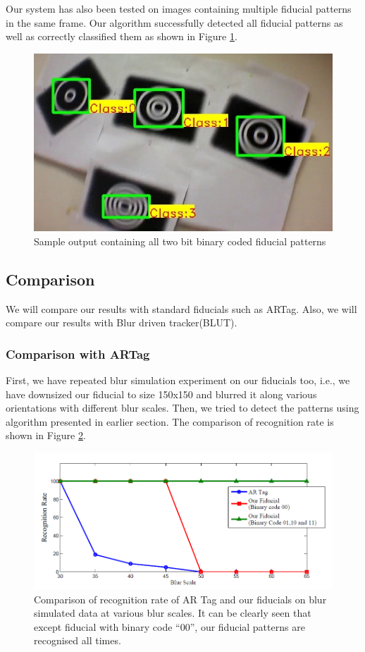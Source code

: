 \documentclass[runningheads]{llncs}
\begin{document}
Our system has also been tested on images containing multiple fiducial patterns
in the same frame. Our algorithm successfully detected all fiducial patterns as
well as correctly classified them as shown in Figure \ref{fig:output_all}.
\begin{figure}
\centering
  \includegraphics[width=.8\linewidth]{output_all_2.jpg}
  \caption{Sample output containing all two bit binary coded fiducial patterns}
  \label{fig:output_all}
\end{figure}

\subsection{Comparison}
We will compare our results with standard fiducials such as ARTag. Also, we will
compare our results with Blur driven tracker(BLUT)\cite{Wu:2011}.
\subsubsection{Comparison with ARTag}
First, we have repeated blur simulation experiment on our fiducials too, i.e.,
we have downsized our fiducial to size 150x150 and blurred it along various
orientations with different blur scales. Then, we tried to detect the patterns
using algorithm presented in earlier section. The comparison of recognition
rate is shown in Figure \ref{fig:recognition_rate}.

\begin{figure}
\centering
\includegraphics[width=\linewidth]{recognition_rate.png}
\caption{Comparison of recognition rate of AR Tag and our fiducials on
blur simulated data at various blur scales. It can be clearly seen that except
fiducial with binary code ``00'', our fiducial patterns are
recognised all times.}
\label{fig:recognition_rate}
\end{figure}
\end{document}
